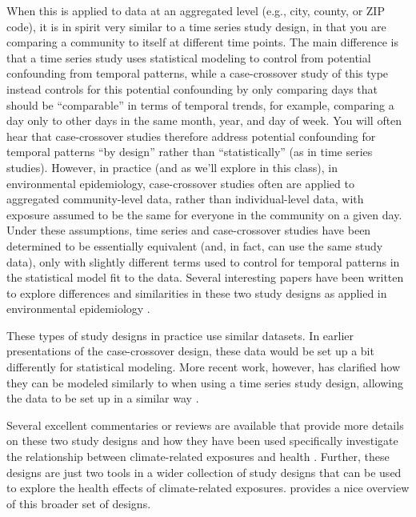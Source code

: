 \documentclass[
]{book}
\begin{document}
When this is applied to data at an aggregated level (e.g., city, county, or ZIP
code), it is in spirit very similar to a time series study design, in that you
are comparing a community to itself at different time points. The main
difference is that a time series study uses statistical modeling to control from
potential confounding from temporal patterns, while a case-crossover study of
this type instead controls for this potential confounding by only comparing days
that should be ``comparable'' in terms of temporal trends, for example, comparing
a day only to other days in the same month, year, and day of week. You will
often hear that case-crossover studies therefore address potential confounding
for temporal patterns ``by design'' rather than ``statistically'' (as in time series
studies). However, in practice (and as we'll explore in this class), in
environmental epidemiology, case-crossover studies often are applied to
aggregated community-level data, rather than individual-level data, with exposure
assumed to be the same for everyone in the community on a given day. Under these
assumptions, time series and case-crossover studies have been determined to
be essentially equivalent (and, in fact, can use the same study data), only with
slightly different terms used to control for temporal patterns in the statistical
model fit to the data. Several interesting papers have been written to explore
differences and similarities in these two study designs as applied in environmental
epidemiology \citep{basu2005temperature, armstrong2014conditional, lu2007equivalence}.

These types of study designs in practice use similar datasets. In earlier
presentations of the case-crossover design, these data would be set up a bit
differently for statistical modeling. More recent work, however, has clarified
how they can be modeled similarly to when using a time series study design,
allowing the data to be set up in a similar way \citep{armstrong2014conditional}.

Several excellent commentaries or reviews are available that provide more
details on these two study designs and how they have been used specifically
investigate the relationship between climate-related exposures and health \citep{bhaskaran2013time, armstrong2006models, gasparrini2010time}.
Further, these designs are just two tools in a wider collection of study designs
that can be used to explore the health effects of climate-related exposures.
\citet{dominici2008statistical1} provides a nice overview of this broader set of designs.
\end{document}
